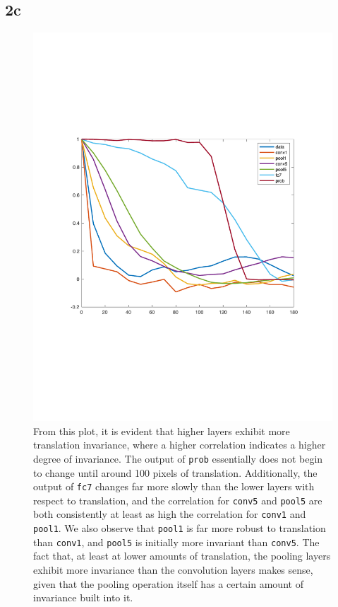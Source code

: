 \documentclass[]{article}
\begin{document}
\subsection*{2c}
\begin{figure}[H]
    \centering
    \includegraphics[width=0.7\linewidth]{problem2C.pdf}
    \caption{From this plot, it is evident that higher layers exhibit more translation invariance, where a higher correlation indicates a higher degree of invariance. The output of \texttt{prob} essentially does not begin to change until around 100 pixels of translation. Additionally, the output of \texttt{fc7} changes far more slowly than the lower layers with respect to translation, and the correlation for \texttt{conv5} and \texttt{pool5} are both consistently at least as high the correlation for \texttt{conv1} and \texttt{pool1}. We also observe that \texttt{pool1} is far more robust to translation than \texttt{conv1}, and \texttt{pool5} is initially more invariant than \texttt{conv5}. The fact that, at least at lower amounts of translation, the pooling layers exhibit more invariance than the convolution layers makes sense, given that the pooling operation itself has a certain amount of invariance built into it.}
    \label{fig:my_label}
\end{figure}
\end{document}
